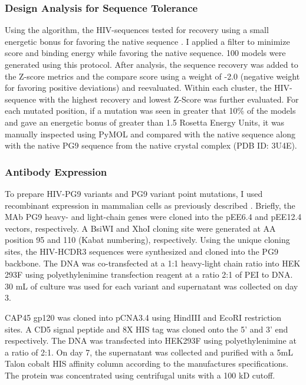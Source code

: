 \subsubsection{Design Analysis for Sequence Tolerance}
Using the \rosettadesign algorithm, the HIV-\naive sequences tested for recovery using a small energetic bonus for favoring the native sequence \citep{Kuhlman:2000tc}. I applied a filter to minimize score and binding energy while favoring the native sequence. 100 models were generated using this protocol. After analysis, the sequence recovery was added to the Z-score metrics and the compare score using a weight of -2.0 (negative weight for favoring positive deviations) and reevaluated. Within each cluster, the HIV-\naive sequence with the highest recovery and lowest Z-Score was further evaluated. For each mutated position, if a mutation was seen in greater that 10\% of the models and gave an energetic bonus of greater than 1.5 Rosetta Energy Units, it was manually inspected using PyMOL and compared with the native sequence along with the native PG9 sequence from the native crystal complex (PDB ID: 3U4E).

\subsubsection{Antibody Expression}
To prepare HIV-\naive PG9 variants and PG9 variant point mutations, I used recombinant expression in mammalian cells as previously described \citep{Xu:2010da}. Briefly, the MAb PG9 heavy- and light-chain genes were cloned into the pEE6.4 and pEE12.4 vectors, respectively. A BsiWI and XhoI cloning site were generated at AA position 95 and 110 (Kabat numbering), respectively. Using the unique cloning sites, the HIV-\naive HCDR3 sequences were synthesized and cloned into the PG9 backbone. The DNA was co-transfected at a 1:1 heavy-light chain ratio into HEK 293F using polyethylenimine transfection reagent at a ratio 2:1 of PEI to DNA. 30 mL of culture was used for each variant and supernatant was collected on day 3.

CAP45 gp120 was cloned into pCNA3.4 using HindIII and EcoRI restriction sites. A CD5 signal peptide and 8X HIS tag was cloned onto the 5' and 3' end respectively. The DNA was transfected into HEK293F using polyethylenimine at a ratio of 2:1. On day 7, the supernatant was collected and purified with a 5mL Talon cobalt HIS affinity column according to the manufactures specifications. The protein was concentrated using centrifugal units with a 100 kD cutoff.

